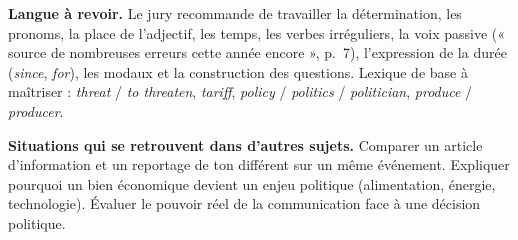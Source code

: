 \documentclass[11pt,a4paper]{article}
\begin{document}
\textbf{Langue à revoir.} Le jury recommande de travailler la détermination, les pronoms, la place de l'adjectif, les temps, les verbes irréguliers, la voix passive (« source de nombreuses erreurs cette année encore », p.~7), l'expression de la durée (\emph{since}, \emph{for}), les modaux et la construction des questions. Lexique de base à maîtriser : \emph{threat} / \emph{to threaten}, \emph{tariff}, \emph{policy} / \emph{politics} / \emph{politician}, \emph{produce} / \emph{producer}.

\textbf{Situations qui se retrouvent dans d'autres sujets.} Comparer un article d'information et un reportage de ton différent sur un même événement. Expliquer pourquoi un bien économique devient un enjeu politique (alimentation, énergie, technologie). Évaluer le pouvoir réel de la communication face à une décision politique.
\end{document}
